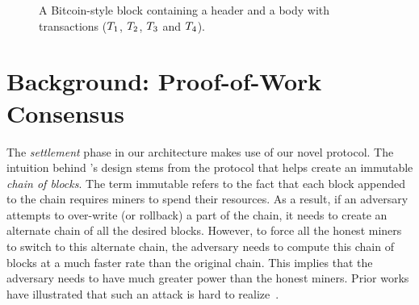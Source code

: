 \begin{figure}[t]\label{ex:pow_block}
       \centering
   \caption{A Bitcoin-style block containing a header and a body with transactions ($\Transaction_1$, $\Transaction_2$, $\Transaction_3$ and $\Transaction_4$).}
   \label{fig:block-structure}
\end{figure}

\section{Background: Proof-of-Work Consensus}
The {\em settlement} phase in our \DualChain{} architecture makes use of 
our novel \PoC{} protocol. The intuition behind \PoC's design stems from the 
\PoW{} protocol that helps create an immutable {\em chain of blocks}. The term 
immutable refers to the fact that each block appended to the chain requires miners 
to spend their resources. As a result, if an adversary attempts to over-write 
(or rollback) a part of the chain, it needs to create an alternate chain of all the 
desired blocks. However, to force all the honest miners to switch to this alternate 
chain, the adversary needs to compute this chain of blocks at a much faster rate 
than the original chain. This implies that the adversary needs to have much greater 
power than the honest miners. Prior works have illustrated that such an attack is 
hard to realize~\cite{bc-processing}.

